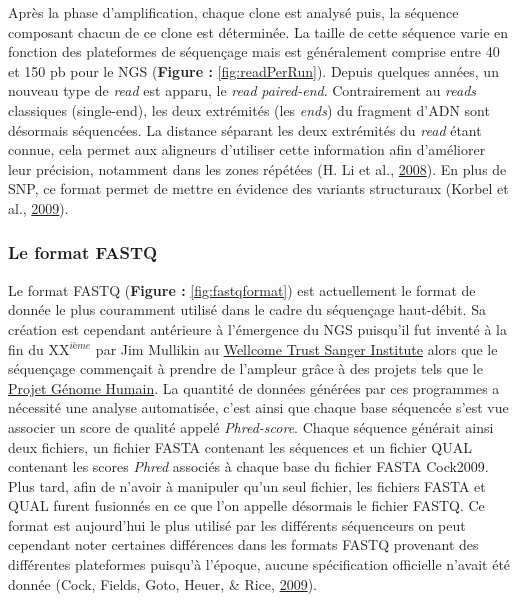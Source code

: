 \documentclass[12pt,twoside]{reedthesis}
\theoremstyle{definition}
\theoremstyle{definition}
\theoremstyle{remark}
\begin{document}
  Après la phase d'amplification, chaque clone est analysé puis, la
  séquence composant chacun de ce clone est déterminée. La taille de cette
  séquence varie en fonction des plateformes de séquençage mais est
  généralement comprise entre 40 et 150 pb pour le NGS (\textbf{Figure :
  }\ref{fig:readPerRun}). Depuis quelques années, un nouveau type de
  \emph{read} est apparu, le \emph{read} \emph{paired-end}. Contrairement
  au \emph{reads} classiques (single-end), les deux extrémités (les
  \emph{ends}) du fragment d'ADN sont désormais séquencées. La distance
  séparant les deux extrémités du \emph{read} étant connue, cela permet
  aux aligneurs d'utiliser cette information afin d'améliorer leur
  précision, notamment dans les zones répétées (H. Li et al.,
  \protect\hyperlink{ref-Li2008}{2008}). En plus de SNP, ce format permet
  de mettre en évidence des variants structuraux (Korbel et al.,
  \protect\hyperlink{ref-Korbel2009}{2009}).
  
  \subsubsection{Le format FASTQ}\label{le-format-fastq}
  
  Le format FASTQ (\textbf{Figure : }\ref{fig:fastqformat}) est
  actuellement le format de donnée le plus couramment utilisé dans le
  cadre du séquençage haut-débit. Sa création est cependant antérieure à
  l'émergence du NGS puisqu'il fut inventé à la fin du XX\(^{ième}\) par
  Jim Mullikin au
  \href{https://fr.wikipedia.org/wiki/Wellcome_Trust_Sanger_Institute}{Wellcome
  Trust Sanger Institute} alors que le séquençage commençait à prendre de
  l'ampleur grâce à des projets tels que le
  \href{https://fr.wikipedia.org/wiki/Projet_G\%C3\%A9nome_Humain}{Projet
  Génome Humain}. La quantité de données générées par ces programmes a
  nécessité une analyse automatisée, c'est ainsi que chaque base séquencée
  s'est vue associer un score de qualité appelé \emph{Phred-score}. Chaque
  séquence générait ainsi deux fichiers, un fichier FASTA contenant les
  séquences et un fichier QUAL contenant les scores \emph{Phred} associés
  à chaque base du fichier FASTA Cock2009. Plus tard, afin de n'avoir à
  manipuler qu'un seul fichier, les fichiers FASTA et QUAL furent
  fusionnés en ce que l'on appelle désormais le fichier FASTQ. Ce format
  est aujourd'hui le plus utilisé par les différents séquenceurs on peut
  cependant noter certaines différences dans les formats FASTQ provenant
  des différentes plateformes puisqu'à l'époque, aucune spécification
  officielle n'avait été donnée (Cock, Fields, Goto, Heuer, \& Rice,
  \protect\hyperlink{ref-Cock2009}{2009}).
  
\end{document}
